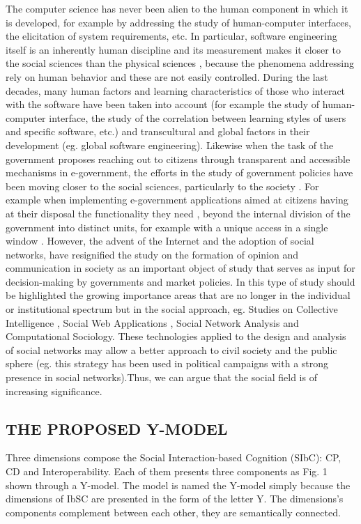 \documentclass[10pt,twocolumn,ieeetran]{article}
\begin{document}
The computer science has never been alien to the human component in which it is developed, for example by addressing the study of human-computer interfaces, the elicitation of system requirements, etc. In particular, software engineering itself is an inherently human discipline and its measurement makes it closer to the social sciences than the physical sciences \cite{Morasca},  because the phenomena addressing rely on human behavior and these are not easily controlled.
During the last decades,  many human factors and learning characteristics of those who interact with the software have been taken into account (for example the study of human-computer interface, the study of the correlation between learning styles of users and specific software, etc.) and transcultural and global factors in their development (eg. global software engineering).
Likewise when the task of the government proposes reaching  out to citizens through transparent and accessible mechanisms in e-government,  the efforts in the study of government policies have been moving closer to the social sciences, particularly to the society \cite{Graham}.
For example when implementing e-government applications aimed at citizens having at their disposal the functionality they need \cite{Fountain}, beyond the internal division of the government into distinct units, for example with a unique access in a single window \cite{OECD}. However, the advent of the Internet and the adoption of social networks, have resignified the study on the formation of opinion and communication in society as an important object of study that serves as input for decision-making by governments and market policies.
In this type of study should be highlighted the growing importance areas that are no longer in the individual or institutional spectrum but in the social approach, eg. Studies on Collective Intelligence \cite{Seragan}, Social Web Applications \cite{Bell}, Social Network Analysis \cite{Tsvetovat} and Computational Sociology. These technologies applied to the design and analysis of social networks may allow a better approach to civil society and the public sphere (eg. this strategy has been used in political campaigns with a strong presence in social networks).Thus, we can argue that the social field is of increasing significance.

\subsection{THE PROPOSED Y-MODEL}

Three dimensions compose the Social Interaction-based Cognition (SIbC): CP, CD and Interoperability. Each of them presents three components as Fig. 1 shown through a Y-model. The model is named the Y-model simply because the dimensions of IbSC are presented in the form of the letter Y. The dimensions's components complement between each other, they are semantically connected.
\end{document}
